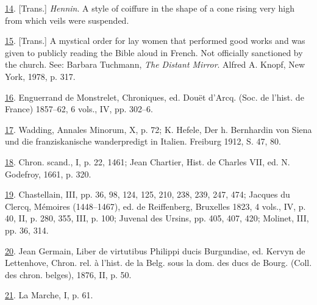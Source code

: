 \protect\hypertarget{23_NOTES.xhtmlux5cux23id_2203}{\protect\hyperlink{08_Chapter_One__THE_PASSIONATE_INTE.xhtmlux5cux23id_2202}{14}}.
{[}Trans.{]} \emph{Hennin}. A style of coiffure in the shape of a cone
rising very high from which veils were suspended.

\protect\hypertarget{23_NOTES.xhtmlux5cux23id_2201}{\protect\hyperlink{08_Chapter_One__THE_PASSIONATE_INTE.xhtmlux5cux23id_2200}{15}}.
{[}Trans.{]} A mystical order for lay women that performed good works
and was given to publicly reading the Bible aloud in French. Not
officially sanctioned by the church. See: Barbara Tuchmann, \emph{The
Distant Mirror}. Alfred A. Knopf, New York, 1978, p. 317.

\protect\hypertarget{23_NOTES.xhtmlux5cux23id_2199}{\protect\hyperlink{08_Chapter_One__THE_PASSIONATE_INTE.xhtmlux5cux23id_2198}{16}}.
Enguerrand de Monstrelet, Chroniques, ed. Douët d'Arcq. (Soc. de l'hist.
de France) 1857--62, 6 vols., IV, pp. 302--6.

\protect\hypertarget{23_NOTES.xhtmlux5cux23id_2197}{\protect\hyperlink{08_Chapter_One__THE_PASSIONATE_INTE.xhtmlux5cux23id_2196}{17}}.
Wadding, Annales Minorum, X, p. 72; K. Hefele, Der h. Bernhardin von
Siena und die franziskanische wanderpredigt in Italien. Freiburg 1912,
S. 47, 80.

\protect\hypertarget{23_NOTES.xhtmlux5cux23id_2195}{\protect\hyperlink{08_Chapter_One__THE_PASSIONATE_INTE.xhtmlux5cux23id_2194}{18}}.
Chron. scand., I, p. 22, 1461; Jean Chartier, Hist. de Charles VII, ed.
N. Godefroy, 1661, p. 320.

\protect\hypertarget{23_NOTES.xhtmlux5cux23id_2193}{\protect\hyperlink{08_Chapter_One__THE_PASSIONATE_INTE.xhtmlux5cux23id_2192}{19}}.
Chastellain, III, pp. 36, 98, 124, 125, 210, 238, 239, 247, 474; Jacques
du Clercq, Mémoires (1448--1467), ed. de Reiffenberg, Bruxelles 1823, 4
vols., IV, p. 40, II, p. 280, 355, III, p. 100; Juvenal des Ursins, pp.
405, 407, 420; Molinet, III, pp. 36, 314.

\protect\hypertarget{23_NOTES.xhtmlux5cux23id_2191}{\protect\hyperlink{08_Chapter_One__THE_PASSIONATE_INTE.xhtmlux5cux23id_2190}{20}}.
Jean Germain, Liber de virtutibus Philippi ducis Burgundiae, ed. Kervyn
de Lettenhove, Chron. rel. à l'hist. de la Belg. sous la dom. des ducs
de Bourg. (Coll. des chron. belges), 1876, II, p. 50.

\protect\hypertarget{23_NOTES.xhtmlux5cux23id_2189}{\protect\hyperlink{08_Chapter_One__THE_PASSIONATE_INTE.xhtmlux5cux23id_2188}{21}}.
La Marche, I, p. 61.

